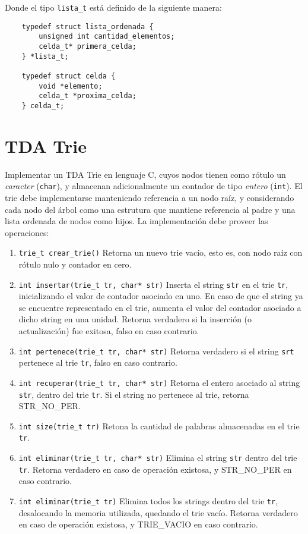 \documentclass[12pt,a4paper]{article}
\begin{document}
Donde el tipo \texttt{lista\_t} está definido de la siguiente manera:

\begin{verbatim}
    typedef struct lista_ordenada {
        unsigned int cantidad_elementos;
        celda_t* primera_celda;
    } *lista_t;

    typedef struct celda {
        void *elemento;
        celda_t *proxima_celda;
    } celda_t;
\end{verbatim}
\section{TDA Trie}

Implementar un TDA Trie en lenguaje C, cuyos nodos tienen como rótulo un \emph{caracter} (\texttt{char}), y almacenan adicionalmente un contador de tipo \emph{entero} (\texttt{int}). El trie debe implementarse manteniendo referencia a un nodo raíz, y considerando cada nodo del árbol como una estrutura que mantiene referencia al padre y una lista ordenada de nodos como hijos. La implementación debe proveer las operaciones:

\begin{enumerate}
	
	\item \texttt{trie\_t crear\_trie()} Retorna un nuevo trie vacío, esto es, con nodo raíz con rótulo nulo y contador en cero.
	
	\item \texttt{int insertar(trie\_t tr, char* str)} Inserta el string
	\texttt{str} en el trie \texttt{tr}, inicializando el valor de contador asociado en uno. En caso de que el string ya se encuentre representado en el trie, aumenta el valor del contador asociado a dicho string en una unidad. Retorna verdadero si la inserción (o actualización) fue exitosa, falso en caso contrario.

	\item \texttt{int pertenece(trie\_t tr, char* str)} Retorna verdadero si el string \texttt{srt} pertenece al trie \texttt{tr}, falso en caso contrario.
	
	\item \texttt{int recuperar(trie\_t tr, char* str)} Retorna el entero asociado al string \texttt{str}, dentro del trie \texttt{tr}. Si el string no pertenece al trie, retorna STR\_NO\_PER.

	\item \texttt{int size(trie\_t tr)} Retona la cantidad de palabras almacenadas en el trie \texttt{tr}.
	
	\item \texttt{int eliminar(trie\_t tr, char* str)} Elimina el string \texttt{str} dentro del trie \texttt{tr}. Retorna verdadero en caso de operación existosa, y STR\_NO\_PER en caso contrario.
		
	\item \texttt{int eliminar(trie\_t tr)} Elimina todos los strings dentro del trie \texttt{tr}, desalocando la memoria utilizada, quedando el trie vacío. Retorna verdadero en caso de operación existosa, y TRIE\_VACIO en caso contrario.
	
	
\end{enumerate}
\end{document}
